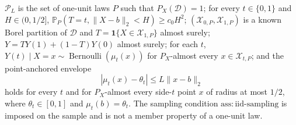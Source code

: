 \(\mathcal P_L\) is the set of one-unit laws \(P\) such that \(P_X(\mathcal D)=1\); for every \(t\in\{0,1\}\) and \(H\in(0,1/2]\), \(\mathbb P_P(T=t,\lVert X-b\rVert_2<H)\geq c_0H^2\); \((\mathcal X_{0,P},\mathcal X_{1,P})\) is a known Borel partition of \(\mathcal D\) and \(T=\mathbf1\{X\in\mathcal X_{1,P}\}\) almost surely; \(Y=TY(1)+(1-T)Y(0)\) almost surely; for each \(t\), \(Y(t)\mid X=x\sim\operatorname{Bernoulli}(\mu_t(x))\) for \(P_X\)-almost every \(x\in\mathcal X_{t,P}\); and the point-anchored envelope
\[
 |\mu_t(x)-\theta_t|\leq L\lVert x-b\rVert_2
\]
holds for every \(t\) and for \(P_X\)-almost every side-\(t\) point \(x\) of radius at most \(1/2\), where \(\theta_t\in[0,1]\) and \(\mu_t(b)=\theta_t\).  The sampling condition \(\mathrm{ass:iid\text{-}sampling}\) is imposed on the sample and is not a member property of a one-unit law.